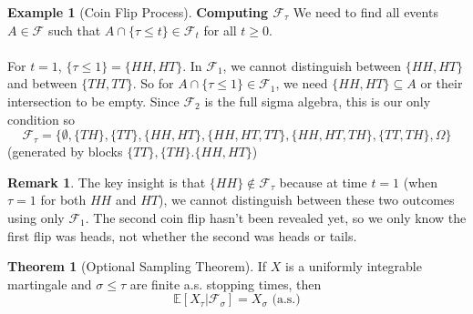 \documentclass[11pt,a4paper]{article}
\theoremstyle{definition}
\newtheorem{theorem}{Theorem}[section]
\newtheorem{example}{Example}[section]
\newtheorem{remark}{Remark}[section]
\begin{document}
\begin{example}[Coin Flip Process]
\textbf{Computing $\mathcal{F}_\tau$}
\noindent
We need to find all events $A \in \mathcal{F}$ such that $A \cap \{\tau \leq t\} \in \mathcal{F}_t$ for all $t \geq 0$.
~\\~\\ \noindent
For $t = 1$, $\{\tau \le 1\} = \{HH, HT\}$. In $\mathcal{F}_1$, we cannot distinguish between $\{HH, HT\}$ and between $\{TH, TT\}$.  So for $A \cap \{\tau \le 1\} \in \mathcal{F}_1$, we need $\{HH, HT\} \subseteq A$ or their intersection to be empty. Since $\mathcal{F}_2$ is the full sigma algebra, this is our only condition so \[
\mathcal{F}_\tau = \{\emptyset, \{TH\}, \{TT\}, \{HH, HT\}, \{HH, HT, TT\}, \{HH, HT, TH\}, \{TT, TH\}, \Omega\}
\]
(generated by blocks $\{TT\}, \{TH\}. \{HH, HT\}$)
\end{example}

\begin{remark}
The key insight is that $\{HH\} \notin \mathcal{F}_\tau$ because at time $t = 1$ (when $\tau = 1$ for both $HH$ and $HT$), we cannot distinguish between these two outcomes using only $\mathcal{F}_1$. The second coin flip hasn't been revealed yet, so we only know the first flip was heads, not whether the second was heads or tails.
\end{remark}


\begin{theorem}[Optional Sampling Theorem]\label{thm:optional_sampling}
If $X$ is a uniformly integrable martingale and $\sigma \leq \tau$ are finite a.s. stopping times, then
\[
\mathbb{E}[X_\tau | \mathcal{F}_\sigma] = X_\sigma \text{ (a.s.)}
\]
\end{theorem}
\end{document}
